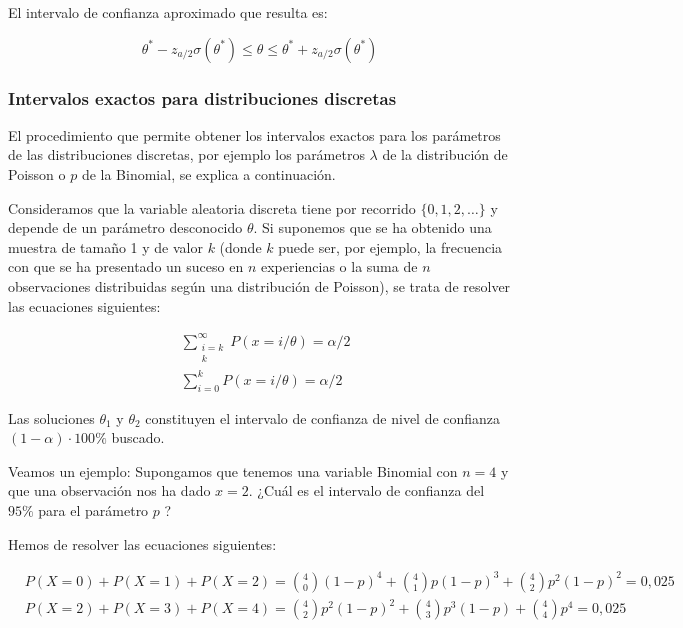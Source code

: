 \documentclass[
]{article}
\begin{document}
El intervalo de confianza aproximado que resulta es:

\[
\theta^{*}-z_{a / 2} \sigma\left(\theta^{*}\right) \leq \theta \leq \theta^{*}+z_{a / 2} \sigma\left(\theta^{*}\right)
\]

\subsubsection{Intervalos exactos para distribuciones discretas}\label{intervalos-exactos-para-distribuciones-discretas}

El procedimiento que permite obtener los intervalos exactos para los parámetros de las distribuciones discretas, por ejemplo los parámetros \(\lambda\) de la distribución de Poisson o \(p\) de la Binomial, se explica a continuación.

Consideramos que la variable aleatoria discreta tiene por recorrido \(\{0,1,2, \ldots\}\) y depende de un parámetro desconocido \(\theta\). Si suponemos que se ha obtenido una muestra de tamaño 1 y de valor \(k\) (donde \(k\) puede ser, por ejemplo, la frecuencia con que se ha presentado un suceso en \(n\) experiencias o la suma de \(n\) observaciones distribuidas según una distribución de Poisson), se trata de resolver las ecuaciones siguientes:

\[
\begin{aligned}
& \sum_{\substack{i=k \\
k}}^{\infty} P(x=i / \theta)=\alpha / 2 \\
& \sum_{i=0}^{k} P(x=i / \theta)=\alpha / 2
\end{aligned}
\]

Las soluciones \(\theta_{1}\) y \(\theta_{2}\) constituyen el intervalo de confianza de nivel de confianza \((1-\alpha) \cdot 100 \%\) buscado.

Veamos un ejemplo:
Supongamos que tenemos una variable Binomial con \(n=4\) y que una observación nos ha dado \(x=2\). ¿Cuál es el intervalo de confianza del \(95 \%\) para el parámetro \(p\) ?

Hemos de resolver las ecuaciones siguientes:

\[
\begin{aligned}
& P(X=0)+P(X=1)+P(X=2)=\binom{4}{0}(1-p)^{4}+\binom{4}{1} p(1-p)^{3}+\binom{4}{2} p^{2}(1-p)^{2}=0,025 \\
& P(X=2)+P(X=3)+P(X=4)=\binom{4}{2} p^{2}(1-p)^{2}+\binom{4}{3} p^{3}(1-p)+\binom{4}{4} p^{4}=0,025
\end{aligned}
\]
\end{document}
